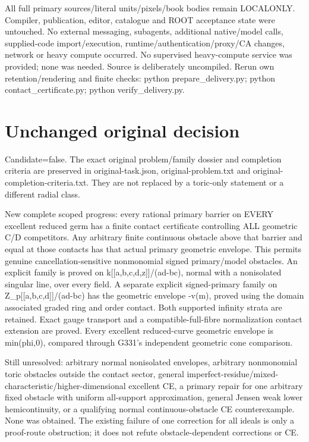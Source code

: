 \documentclass[11pt]{article}
\begin{document}
All full primary sources/literal units/pixels/book bodies remain LOCALONLY. Compiler, publication, editor, catalogue and ROOT acceptance state were untouched. No external messaging, subagents, additional native/model calls, supplied-code import/execution, runtime/authentication/proxy/CA changes, network or heavy compute occurred. No supervised heavy-compute service was provided; none was needed. Source is deliberately uncompiled. Rerun own retention/rendering and finite checks: python prepare\_delivery.py; python contact\_certificate.py; python verify\_delivery.py.
\section{Unchanged original decision}

Candidate=false. The exact original problem/family dossier and completion criteria are preserved in original-task.json, original-problem.txt and original-completion-criteria.txt. They are not replaced by a toric-only statement or a different radial class.

New complete scoped progress: every rational primary barrier on EVERY excellent reduced germ has a finite contact certificate controlling ALL geometric C/D competitors. Any arbitrary finite continuous obstacle above that barrier and equal at those contacts has that actual primary geometric envelope. This permits genuine cancellation-sensitive nonmonomial signed primary/model obstacles. An explicit family is proved on k[[a,b,c,d,z]]/(ad-bc), normal with a nonisolated singular line, over every field. A separate explicit signed-primary family on Z\_p[[a,b,c,d]]/(ad-bc) has the geometric envelope -v(m), proved using the domain associated graded ring and order contact. Both supported infinity strata are retained. Exact gauge transport and a compatible-full-fibre normalization contact extension are proved. Every excellent reduced-curve geometric envelope is min(phi,0), compared through G331's independent geometric cone comparison.

Still unresolved: arbitrary normal nonisolated envelopes, arbitrary nonmonomial toric obstacles outside the contact sector, general imperfect-residue/mixed-characteristic/higher-dimensional excellent CE, a primary repair for one arbitrary fixed obstacle with uniform all-support approximation, general Jensen weak lower hemicontinuity, or a qualifying normal continuous-obstacle CE counterexample. None was obtained. The existing failure of one correction for all ideals is only a proof-route obstruction; it does not refute obstacle-dependent corrections or CE.
\end{document}
